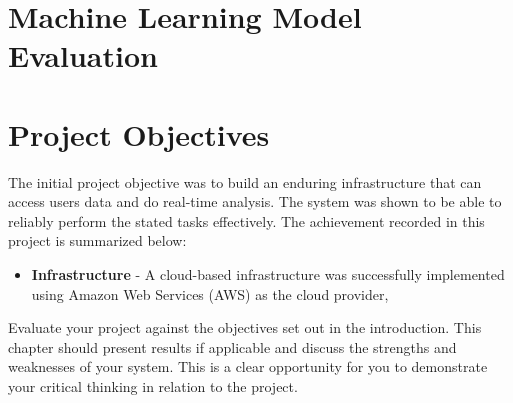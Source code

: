 \section{Machine Learning Model Evaluation}

\section{Project Objectives}
The initial project objective was to build an enduring infrastructure that can access users data and do real-time analysis. The system was shown to be able to reliably 
perform the stated tasks effectively. The achievement recorded in this project is summarized below:
\begin{itemize}
\item \textbf{Infrastructure} - A cloud-based infrastructure was successfully implemented using Amazon Web Services (AWS) as the cloud provider,  
\end{itemize}



Evaluate your project against the objectives set out in the introduction.
This chapter should present results if applicable and discuss the strengths and weaknesses of your system. This is a clear opportunity for you to 
demonstrate your critical thinking in relation to the project. 